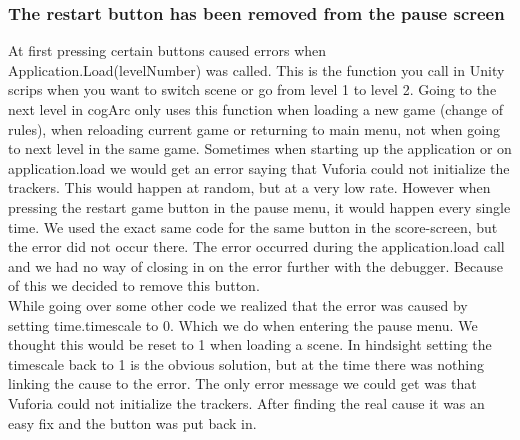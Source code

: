 \subsubsection{The restart button has been removed from the pause screen}
At first pressing certain buttons caused errors when Application.Load(levelNumber) was called. This is the function you call in Unity scrips when you want to switch scene or go from level 1 to level 2. Going to the next level in cogArc only uses this function when loading a new game (change of rules), when reloading current game or returning to main menu, not when going to next level in the same game. Sometimes when starting up the application or on application.load we would get an error saying that Vuforia could not initialize the trackers. This would happen at random, but at a very low rate. However when pressing the restart game button in the pause menu, it would happen every single time. We used the exact same code for the same button in the score-screen, but the error did not occur there. The error occurred during the application.load call and we had no way of closing in on the error further with the debugger. Because of this we decided to remove this button.\\
While going over some other code we realized that the error was caused by setting time.timescale to 0. Which we do when entering the pause menu. We thought this would be reset to 1 when loading a scene. In hindsight setting the timescale back to 1 is the obvious solution, but at the time there was nothing linking the cause to the error. The only error message we could get was that Vuforia could not initialize the trackers. After finding the real cause it was an easy fix and the button was put back in.  
